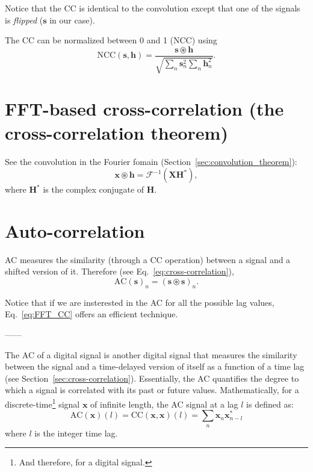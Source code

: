 Notice that the \gls{CC} is identical to the convolution except that
one of the signals is \emph{flipped} ($\mathbf{s}$ in our case).

The \gls{CC} can be normalized between 0 and 1 (\gls{NCC}) using
\begin{equation}
  \text{NCC}(\mathbf{s},\mathbf{h})=\frac{{\mathbf{s}\circledast\mathbf{h}}}{\sqrt{\sum_n \mathbf{s}_n^2 \sum_n \mathbf{h}_n^2}}.
\end{equation}


\section{FFT-based cross-correlation (the cross-correlation theorem)}

See the convolution in the Fourier fomain (Section~\ref{sec:convolution_theorem}):
\begin{equation}
  \mathbf{x}\circledast\mathbf{h} = \mathcal{F}^{-1}(\mathbf{X}\mathbf{H}^*),
  \label{eq:FFT_CC}
\end{equation}
where $\mathbf{H}^*$ is the complex conjugate of $\mathbf{H}$.


\section{Auto-correlation}
\label{sec:auto-correlation}

\gls{AC} measures the similarity (through a \gls{CC} operation)
between a signal and a shifted version of it. Therefore (see
Eq.~\ref{eq:cross-correlation}),
\begin{equation}
  \text{AC}(\mathbf{s})_n = (\mathbf{s}\circledast\mathbf{s})_n.
\end{equation}

Notice that if we are insterested in the \gls{AC} for all the possible lag values,  Eq.~\ref{eq:FFT_CC} offers an efficient technique.

------

The \gls{AC} of a digital signal is another digital signal that
measures the similarity between the signal and a time-delayed version
of itself as a function of a time lag (see
Section~\ref{sec:cross-correlation}). Essentially, the \gls{AC}
quantifies the degree to which a signal is correlated with its past or
future values. Mathematically, for a discrete-time\footnote{And
  therefore, for a digital signal.} signal $\mathbf{x}$ of infinite
length, the \gls{AC} signal at a lag $l$ is defined as:
\begin{equation}
  \text{AC}(\mathbf{x})(l)=\text{CC}(\mathbf{x},\mathbf{x})(l)=\sum_n{\mathbf{x}}_n \mathbf{x}^*_{n-l}
\end{equation}
where $l$ is the integer time lag.

